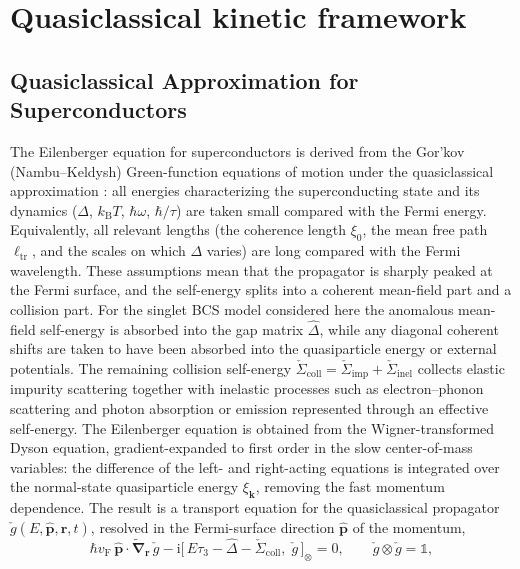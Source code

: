 \documentclass[
  aps,
  prb,
  preprint,
  superscriptaddress,
  longbibliography,
  nofootinbib
]{revtex4-2}
\newcommand{\ii}{\mathrm{i}}
\newcommand{\br}{\mathbf{r}}
\newcommand{\bk}{\mathbf{k}}
\newcommand{\bp}{\mathbf{p}}
\newcommand{\bnabla}{\boldsymbol{\nabla}}
\newcommand{\vF}{v_{\mathrm{F}}}
\newcommand{\elltr}{\ell_{\mathrm{tr}}}
\newcommand{\checkg}{\check{g}}
\newcommand{\hatD}{\hat{\Delta}}
\providecommand{\openone}{}\renewcommand{\openone}{\mathds{1}}
\begin{document}
\section{Quasiclassical kinetic framework}
\label{sec:quasiclassical}
\subsection{Quasiclassical Approximation for Superconductors}
The Eilenberger equation for superconductors is derived from the
Gor'kov (Nambu--Keldysh) Green-function equations of motion under the
quasiclassical approximation
\cite{eilenberger1968,eliashberg1972,larkin1986,rammer1986,kopnin2001}:
all energies characterizing the superconducting state and its dynamics
(\(\Delta\), \(k_{\mathrm B}T\), \(\hbar\omega\), \(\hbar/\tau\)) are taken small
compared with the Fermi energy. Equivalently, all relevant lengths
(the coherence length \(\xi_0\), the mean free path \(\elltr\), and
the scales on which \(\Delta\) varies) are long compared with the
Fermi wavelength. These assumptions mean that the propagator is sharply peaked at the
Fermi surface, and the self-energy splits into a coherent mean-field
part and a collision part. For the singlet BCS model considered here the
anomalous mean-field self-energy is absorbed into the gap matrix
\(\hatD\), while any diagonal coherent shifts are taken to have been
absorbed into the quasiparticle energy or external potentials. The
remaining collision self-energy
\(\check{\Sigma}_{\mathrm{coll}}=\check{\Sigma}_{\mathrm{imp}}+\check{\Sigma}_{\mathrm{inel}}\)
collects elastic impurity scattering together with inelastic processes
such as electron--phonon scattering and photon absorption or emission
represented through an effective self-energy. The Eilenberger equation is obtained from the Wigner-transformed
Dyson equation, gradient-expanded to first order in the slow
center-of-mass variables: the difference of the left- and
right-acting equations is integrated over the normal-state
quasiparticle energy \(\xi_{\bk}\), removing the fast momentum
dependence. The result is a transport equation for the
quasiclassical propagator \(\checkg(E,\hat{\bp},\br,t)\), resolved in
the Fermi-surface direction \(\hat{\bp}\) of the momentum,
\begin{equation}
  \hbar\vF\,\hat{\bp}\cdot\widetilde{\bnabla}_{\br}\,\checkg
  -
  \ii\bigl[\,E\tau_3-\hatD-\check{\Sigma}_{\mathrm{coll}},\;\checkg\,\bigr]_{\otimes}
  =
  0,
  \qquad
  \checkg\otimes\checkg=\openone,
  \label{eq:intro_eilenberger}
\end{equation}
\end{document}
